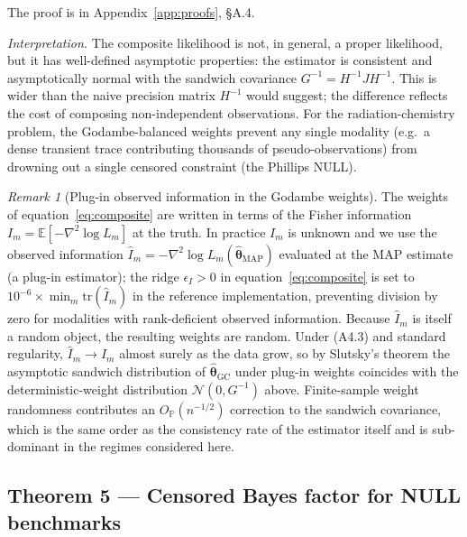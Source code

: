 \documentclass[12pt]{article}
\theoremstyle{plain}
\theoremstyle{definition}
\theoremstyle{remark}
\newtheorem{remark}{Remark}
\newcommand{\E}{\mathbb{E}}
\begin{document}
The proof is in Appendix~\ref{app:proofs}, \S A.4.

\emph{Interpretation.}  The composite likelihood is not, in general,
a proper likelihood, but it has well-defined asymptotic properties:
the estimator is consistent and asymptotically normal with the
sandwich covariance $G^{-1}=H^{-1}JH^{-1}$.  This is wider than the
naive precision matrix $H^{-1}$ would suggest; the difference reflects
the cost of composing non-independent observations.  For the
radiation-chemistry problem, the Godambe-balanced weights prevent any
single modality (e.g.\ a dense transient trace contributing thousands
of pseudo-observations) from drowning out a single censored constraint
(the Phillips NULL).

\begin{remark}[Plug-in observed information in the Godambe weights]
\label{rem:plug_in_godambe}
The weights of equation~\eqref{eq:composite} are written in terms of the
Fisher information $I_m=\E[-\nabla^2\log L_m]$ at the truth.  In practice
$I_m$ is unknown and we use the observed information
$\hat I_m=-\nabla^2\log L_m(\hat{\boldsymbol\theta}_{\mathrm{MAP}})$
evaluated at the MAP estimate (a plug-in estimator); the ridge
$\epsilon_I>0$ in equation~\eqref{eq:composite} is set to
$10^{-6}\times\min_m\mathrm{tr}(\hat I_m)$ in the reference implementation,
preventing division by zero for modalities with rank-deficient observed
information.  Because $\hat I_m$ is itself a random object, the resulting
weights are random.  Under (A4.3) and standard regularity,
$\hat I_m\to I_m$ almost surely as the data grow, so by Slutsky's theorem
the asymptotic sandwich distribution of $\hat{\boldsymbol\theta}_{\mathrm{GC}}$
under plug-in weights coincides with the deterministic-weight distribution
$\mathcal{N}(0,G^{-1})$ above.  Finite-sample weight randomness contributes
an $O_{\mathbb{P}}(n^{-1/2})$ correction to the sandwich covariance, which
is the same order as the consistency rate of the estimator itself and is
sub-dominant in the regimes considered here.
\end{remark}

\subsection{Theorem 5 --- Censored Bayes factor for NULL benchmarks}\label{sec:thm5}
\end{document}
